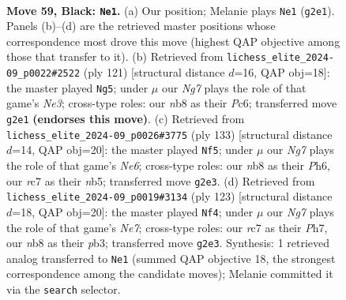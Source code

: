 \documentclass[11pt]{article}
\begin{document}
\clearpage

\begin{figure}[p]\centering
\begin{subfigure}{0.46\textwidth}\centering
\resizebox{\linewidth}{!}{%
\newchessgame
\chessboard[
  setfen={1N6/2R5/3p1k2/8/6pp/1p6/6n1/6K1 b - - 0 59},
  showmover=false,
  pgfstyle=straightmove, color=movearrow, markmove={g2-e1}
]}
\caption{}
\end{subfigure}\hfill
\begin{subfigure}{0.46\textwidth}\centering
\resizebox{\linewidth}{!}{%
\newchessgame
\chessboard[
  setfen={8/8/2p1n2P/4K3/8/2k5/2p3P1/5R2 b - - 2 61},
  showmover=false,
  pgfstyle=straightmove, color=movearrow, markmove={e6-g5}
]}
\caption{}
\end{subfigure}
\\[4pt]
\begin{subfigure}{0.46\textwidth}\centering
\resizebox{\linewidth}{!}{%
\newchessgame
\chessboard[
  setfen={8/8/7p/1N2k1pP/6p1/4n3/5K2/8 b - - 1 67},
  showmover=false,
  pgfstyle=straightmove, color=movearrow, markmove={e3-f5}
]}
\caption{}
\end{subfigure}\hfill
\begin{subfigure}{0.46\textwidth}\centering
\resizebox{\linewidth}{!}{%
\newchessgame
\chessboard[
  setfen={8/7p/7P/1k1pp3/8/1P4p1/3Kn3/4N3 b - - 3 62},
  showmover=false,
  pgfstyle=straightmove, color=movearrow, markmove={e2-f4}
]}
\caption{}
\end{subfigure}
\caption{\textbf{Move 59, Black: \texttt{Ne1}.} (a) Our position; Melanie plays \texttt{Ne1} (\texttt{g2e1}). Panels (b)--(d) are the retrieved master positions whose correspondence most drove this move (highest QAP objective among those that transfer to it). (b) Retrieved from \texttt{lichess\_elite\_2024-09\_p0022\#2522} (ply 121) [structural distance $d$=16, QAP obj=18]: the master played \texttt{Ng5}; under $\mu$ our \emph{Ng7} plays the role of that game's \emph{Ne3}; cross-type roles: our \emph{n}b8 as their \emph{P}c6; transferred move \texttt{g2e1} \textbf{(endorses this move)}. (c) Retrieved from \texttt{lichess\_elite\_2024-09\_p0026\#3775} (ply 133) [structural distance $d$=14, QAP obj=20]: the master played \texttt{Nf5}; under $\mu$ our \emph{Ng7} plays the role of that game's \emph{Ne6}; cross-type roles: our \emph{n}b8 as their \emph{P}h6, our \emph{r}c7 as their \emph{n}b5; transferred move \texttt{g2e3}. (d) Retrieved from \texttt{lichess\_elite\_2024-09\_p0019\#3134} (ply 123) [structural distance $d$=18, QAP obj=20]: the master played \texttt{Nf4}; under $\mu$ our \emph{Ng7} plays the role of that game's \emph{Ne7}; cross-type roles: our \emph{r}c7 as their \emph{P}h7, our \emph{n}b8 as their \emph{p}b3; transferred move \texttt{g2e3}. Synthesis: 1 retrieved analog transferred to \texttt{Ne1} (summed QAP objective 18, the strongest correspondence among the candidate moves); Melanie committed it via the \texttt{search} selector.}
\label{fig:thought-m117}
\end{figure}
\end{document}
